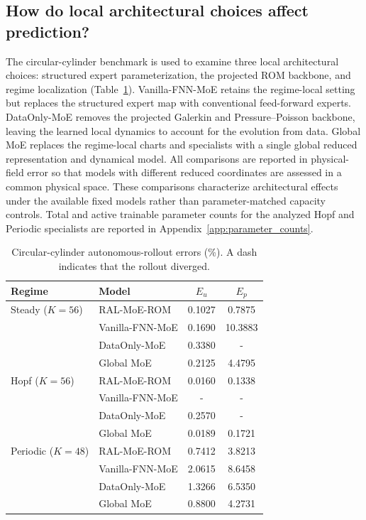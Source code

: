 \documentclass{article}
\begin{document}
\subsection{How do local architectural choices affect prediction?}

The circular-cylinder benchmark is used to examine three local architectural choices: structured expert parameterization, the projected ROM backbone, and regime localization (Table~\ref{tab:circular_full_reorg}). Vanilla-FNN-MoE retains the regime-local setting but replaces the structured expert map with conventional feed-forward experts. DataOnly-MoE removes the projected Galerkin and Pressure--Poisson backbone, leaving the learned local dynamics to account for the evolution from data. Global MoE replaces the regime-local charts and specialists with a single global reduced representation and dynamical model. All comparisons are reported in physical-field error so that models with different reduced coordinates are assessed in a common physical space. These comparisons characterize architectural effects under the available fixed models rather than parameter-matched capacity controls. Total and active trainable parameter counts for the analyzed Hopf and Periodic specialists are reported in Appendix~\ref{app:parameter_counts}.

\begin{table}[H]
\centering
\caption{Circular-cylinder autonomous-rollout errors (\%). A dash indicates that the rollout diverged.}
\label{tab:circular_full_reorg}
\small
\setlength{\tabcolsep}{4pt}
\begin{tabular}{llcc}
\toprule
Regime & Model & $E_u$ & $E_p$ \\
\midrule
Steady ($K=56$)
& RAL-MoE-ROM & 0.1027 & 0.7875 \\
& Vanilla-FNN-MoE & 0.1690 & 10.3883 \\
& DataOnly-MoE & 0.3380 & - \\
& Global MoE & 0.2125 & 4.4795 \\
\midrule
Hopf ($K=56$)
& RAL-MoE-ROM & 0.0160 & 0.1338 \\
& Vanilla-FNN-MoE & - & - \\
& DataOnly-MoE & 0.2570 & - \\
& Global MoE & 0.0189 & 0.1721 \\
\midrule
Periodic ($K=48$)
& RAL-MoE-ROM & 0.7412 & 3.8213 \\
& Vanilla-FNN-MoE & 2.0615 & 8.6458 \\
& DataOnly-MoE & 1.3266 & 6.5350 \\
& Global MoE & 0.8800 & 4.2731 \\
\bottomrule
\end{tabular}
\end{table}
\end{document}

